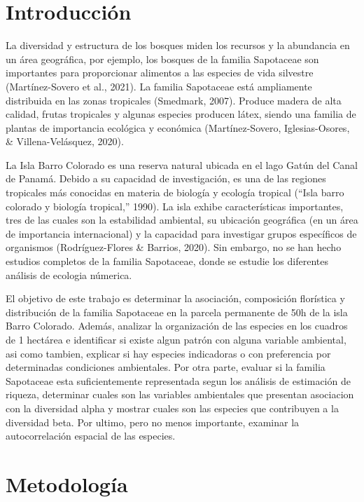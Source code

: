 \documentclass[11pt,]{article}
\begin{document}
\vskip 6.5pt


\noindent  \section{Introducción}\label{introducciuxf3n}

La diversidad y estructura de los bosques miden los recursos y la
abundancia en un área geográfica, por ejemplo, los bosques de la familia
Sapotaceae son importantes para proporcionar alimentos a las especies de
vida silvestre (Martínez-Sovero et al., 2021). La familia Sapotaceae
está ampliamente distribuida en las zonas tropicales (Smedmark, 2007).
Produce madera de alta calidad, frutas tropicales y algunas especies
producen látex, siendo una familia de plantas de importancia ecológica y
económica (Martínez-Sovero, Iglesias-Osores, \& Villena-Velásquez,
2020).

La Isla Barro Colorado es una reserva natural ubicada en el lago Gatún
del Canal de Panamá. Debido a su capacidad de investigación, es una de
las regiones tropicales más conocidas en materia de biología y ecología
tropical (``Isla barro colorado y biología tropical,'' 1990). La isla
exhibe características importantes, tres de las cuales son la
estabilidad ambiental, su ubicación geográfica (en un área de
importancia internacional) y la capacidad para investigar grupos
específicos de organismos (Rodríguez-Flores \& Barrios, 2020). Sin
embargo, no se han hecho estudios completos de la familia Sapotaceae,
donde se estudie los diferentes análisis de ecologia númerica.

El objetivo de este trabajo es determinar la asociación, composición
florística y distribución de la familia Sapotaceae en la parcela
permanente de 50h de la isla Barro Colorado. Además, analizar la
organización de las especies en los cuadros de 1 hectárea e identificar
si existe algun patrón con alguna variable ambiental, asi como tambien,
explicar si hay especies indicadoras o con preferencia por determinadas
condiciones ambientales. Por otra parte, evaluar si la familia
Sapotaceae esta suficientemente representada segun los análisis de
estimación de riqueza, determinar cuales son las variables ambientales
que presentan asociacion con la diversidad alpha y mostrar cuales son
las especies que contribuyen a la diversidad beta. Por ultimo, pero no
menos importante, examinar la autocorrelación espacial de las especies.

\section{Metodología}\label{metodologuxeda}
\end{document}
